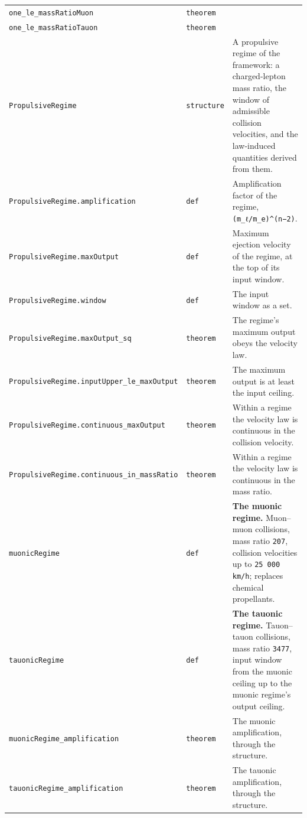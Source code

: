 \documentclass[11pt,a4paper]{article}
\begin{document}
\begin{center}
\begin{longtable}{@{}p{}p{}p{}@{}}
\texttt{one\_\allowbreak{}le\_\allowbreak{}massRatioMuon} & \texttt{theorem} & \small  \\
\texttt{one\_\allowbreak{}le\_\allowbreak{}massRatioTauon} & \texttt{theorem} & \small  \\
\texttt{PropulsiveRegime} & \texttt{structure} & \small A propulsive regime of the framework: a charged-lepton mass ratio, the window of admissible collision velocities, and the law-induced quantities derived from them. \\
\texttt{PropulsiveRegime.amplification} & \texttt{def} & \small Amplification factor of the regime, \texttt{(m\_\allowbreak{}ℓ/m\_\allowbreak{}e)\textasciicircum{}(n−2)}. \\
\texttt{PropulsiveRegime.maxOutput} & \texttt{def} & \small Maximum ejection velocity of the regime, at the top of its input window. \\
\texttt{PropulsiveRegime.window} & \texttt{def} & \small The input window as a set. \\
\texttt{PropulsiveRegime.maxOutput\_\allowbreak{}sq} & \texttt{theorem} & \small The regime's maximum output obeys the velocity law. \\
\texttt{PropulsiveRegime.inputUpper\_\allowbreak{}le\_\allowbreak{}maxOutput} & \texttt{theorem} & \small The maximum output is at least the input ceiling. \\
\texttt{PropulsiveRegime.continuous\_\allowbreak{}maxOutput} & \texttt{theorem} & \small Within a regime the velocity law is continuous in the collision velocity. \\
\texttt{PropulsiveRegime.continuous\_\allowbreak{}in\_\allowbreak{}massRatio} & \texttt{theorem} & \small Within a regime the velocity law is continuous in the mass ratio. \\
\texttt{muonicRegime} & \texttt{def} & \small \textbf{The muonic regime.}  Muon–muon collisions, mass ratio \texttt{207}, collision velocities up to \texttt{25 000 km/h}; replaces chemical propellants. \\
\texttt{tauonicRegime} & \texttt{def} & \small \textbf{The tauonic regime.}  Tauon–tauon collisions, mass ratio \texttt{3477}, input window from the muonic ceiling up to the muonic regime's output ceiling. \\
\texttt{muonicRegime\_\allowbreak{}amplification} & \texttt{theorem} & \small The muonic amplification, through the structure. \\
\texttt{tauonicRegime\_\allowbreak{}amplification} & \texttt{theorem} & \small The tauonic amplification, through the structure. \\

\end{longtable}
\end{center}
\end{document}
